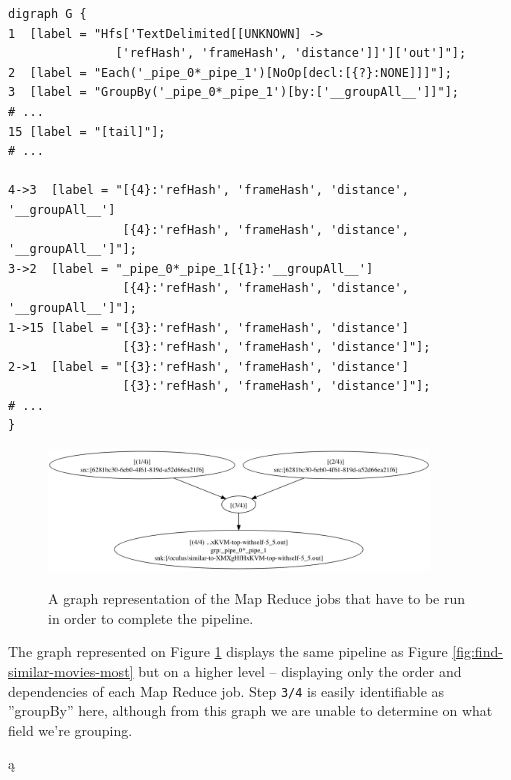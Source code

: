 \begin{lstlisting}[caption={Example of Scalding Pipeline exported from the Cascading FlowPlanner using the DOT format}, label={lst:find-similar-movies-most-complicated-lst}]
digraph G {
1  [label = "Hfs['TextDelimited[[UNKNOWN] -> 
               ['refHash', 'frameHash', 'distance']]']['out']"];
2  [label = "Each('_pipe_0*_pipe_1')[NoOp[decl:[{?}:NONE]]]"];
3  [label = "GroupBy('_pipe_0*_pipe_1')[by:['__groupAll__']]"];
# ...
15 [label = "[tail]"];
# ...
    
4->3  [label = "[{4}:'refHash', 'frameHash', 'distance', '__groupAll__']
                [{4}:'refHash', 'frameHash', 'distance', '__groupAll__']"];
3->2  [label = "_pipe_0*_pipe_1[{1}:'__groupAll__']
                [{4}:'refHash', 'frameHash', 'distance', '__groupAll__']"];
1->15 [label = "[{3}:'refHash', 'frameHash', 'distance']
                [{3}:'refHash', 'frameHash', 'distance']"];
2->1  [label = "[{3}:'refHash', 'frameHash', 'distance']
                [{3}:'refHash', 'frameHash', 'distance']"];
# ...
}
\end{lstlisting}


\begin{figure}[ch!]
  \centering
  \includegraphics[width=0.9\textwidth]{img/FindSimilarMoviesV2Job-steps_dot.png}
  \label{fig:find-similar-movies-most-complicated-steps}
  \caption{A graph representation of the Map Reduce jobs that have to be run in order to complete the pipeline.}
\end{figure}

The graph represented on Figure \ref{fig:find-similar-movies-most-complicated-steps} displays the same pipeline as Figure \ref{fig:find-similar-movies-most} but on a higher level -- displaying only the order and dependencies of each Map Reduce job. Step \verb|3/4| is easily identifiable as ''groupBy'' here, although from this graph we are unable to determine on what field we're grouping.


ą





